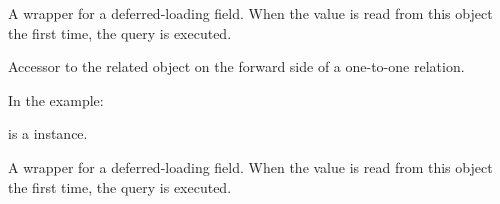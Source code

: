 \documentclass[letterpaper,10pt,english]{sphinxmanual}
\begin{document}
\begin{fulllineitems}
\begin{fulllineitems}
\end{fulllineitems}


\begin{fulllineitems}
\label{\detokenize{QuChemPedIA.models:QuChemPedIA.models.ImportRuleModel.ImportRule.id_software_id}}
A wrapper for a deferred-loading field. When the value is read from this
object the first time, the query is executed.

\end{fulllineitems}


\begin{fulllineitems}
\label{\detokenize{QuChemPedIA.models:QuChemPedIA.models.ImportRuleModel.ImportRule.id_version}}
Accessor to the related object on the forward side of a one-to-one relation.

In the example:

%
\begin{sphinxVerbatim}[commandchars=\\\{\}]
 
       
\end{sphinxVerbatim}

 is a  instance.

\end{fulllineitems}


\begin{fulllineitems}
\label{\detokenize{QuChemPedIA.models:QuChemPedIA.models.ImportRuleModel.ImportRule.id_version_id}}
A wrapper for a deferred-loading field. When the value is read from this
object the first time, the query is executed.

\end{fulllineitems}


\end{fulllineitems}
\end{document}
